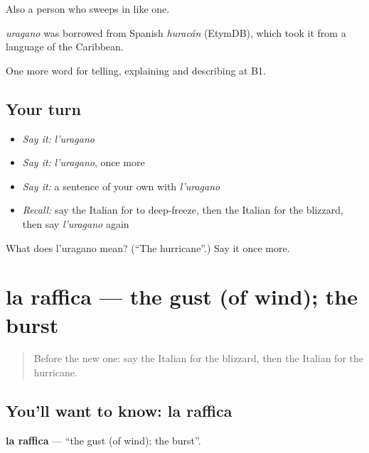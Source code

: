 Also a person who sweeps in like one.

\begin{cousinweb}
\emph{uragano} was borrowed from Spanish \emph{huracán} (EtymDB), which took it from a language of the Caribbean.
\end{cousinweb}

\begin{grammarlens}[title={What you've built}]
One more word for telling, explaining and describing at B1.
\end{grammarlens}

\subsection*{Your turn}
\begin{itemize}
\raggedright
  \item \emph{Say it:} \emph{l'uragano}
  \item \emph{Say it:} \emph{l'uragano}, once more
  \item \emph{Say it:} a sentence of your own with \emph{l'uragano}
  \item \emph{Recall:} say the Italian for to deep-freeze, then the Italian for the blizzard, then say \emph{l'uragano} again
\end{itemize}

\begin{tcolorbox}[breakable,colback=teal!4,colframe=teal!35!black,title={Before you move on}]
What does l'uragano mean? (\textquotedblleft{}The hurricane\textquotedblright{}.) Say it once more.
\end{tcolorbox}
\section[la raffica]{la raffica — the gust (of wind); the burst}

\label{lesson:IT-C469-raffica}



\begin{quote}
Before the new one: say the Italian for the blizzard, then the Italian for the hurricane.
\end{quote}

\subsection*{You'll want to know: la raffica}
\textbf{la raffica} — \textquotedblleft{}the gust (of wind); the burst\textquotedblright{}.

